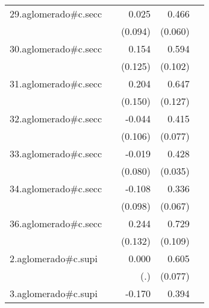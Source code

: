 {\begin{longtable}{l*{4}{D{.}{.}{-1}}}
\addlinespace
29.aglomerado#c.secc&                     &       0.025         &       0.466\sym{***}&                     \\
            &                     &     (0.094)         &     (0.060)         &                     \\
\addlinespace
30.aglomerado#c.secc&                     &       0.154         &       0.594\sym{***}&                     \\
            &                     &     (0.125)         &     (0.102)         &                     \\
\addlinespace
31.aglomerado#c.secc&                     &       0.204         &       0.647\sym{***}&                     \\
            &                     &     (0.150)         &     (0.127)         &                     \\
\addlinespace
32.aglomerado#c.secc&                     &      -0.044         &       0.415\sym{***}&                     \\
            &                     &     (0.106)         &     (0.077)         &                     \\
\addlinespace
33.aglomerado#c.secc&                     &      -0.019         &       0.428\sym{***}&                     \\
            &                     &     (0.080)         &     (0.035)         &                     \\
\addlinespace
34.aglomerado#c.secc&                     &      -0.108         &       0.336\sym{***}&                     \\
            &                     &     (0.098)         &     (0.067)         &                     \\
\addlinespace
36.aglomerado#c.secc&                     &       0.244         &       0.729\sym{***}&                     \\
            &                     &     (0.132)         &     (0.109)         &                     \\
\addlinespace
2.aglomerado#c.supi&                     &       0.000         &       0.605\sym{***}&                     \\
            &                     &         (.)         &     (0.077)         &                     \\
\addlinespace
3.aglomerado#c.supi&                     &      -0.170         &       0.394\sym{***}&                     \\

\end{longtable}}
